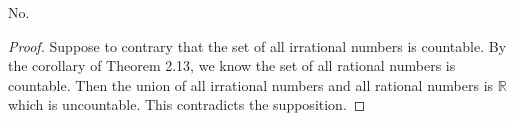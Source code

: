 \begin{Exercise}
	\begin{answer}
		No. 
	\end{answer}
	\begin{proof}
		Suppose to contrary that the set of all irrational numbers is countable.
		By the corollary of Theorem 2.13, we know the set of all rational numbers is countable. 
		Then the union of all irrational numbers and all rational numbers is $\mathbb{R}$ which is uncountable. 
		This contradicts the supposition.
	\end{proof}
\end{Exercise}